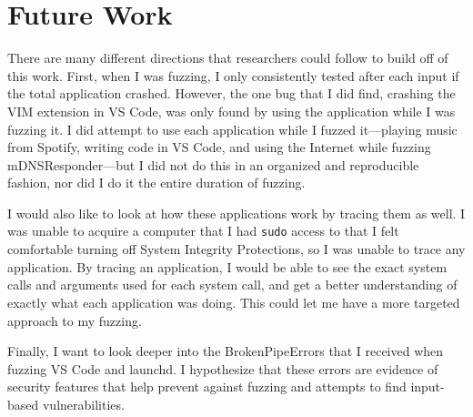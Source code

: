 \chapter{Future Work}
\label{sec:futureWork}
There are many different directions that researchers could follow to build off of this work.  First, when I was fuzzing, I only consistently tested after each input if the total application crashed.  However, the one bug that I did find, crashing the VIM extension in VS Code, was only found by using the application while I was fuzzing it.  I did attempt to use each application while I fuzzed it---playing music from Spotify, writing code in VS Code, and using the Internet while fuzzing mDNSResponder---but I did not do this in an organized and reproducible fashion, nor did I do it the entire duration of fuzzing.

I would also like to look at how these applications work by tracing them as well.  I was unable to acquire a computer that I had \texttt{sudo} access to that I felt comfortable turning off System Integrity Protections, so I was unable to trace any application.  By tracing an application, I would be able to see the exact system calls and arguments used for each system call, and get a better understanding of exactly what each application was doing.  This could let me have a more targeted approach to my fuzzing.

Finally, I want to look deeper into the BrokenPipeErrors that I received when fuzzing VS Code and launchd.  I hypothesize that these errors are evidence of security features that help prevent against fuzzing and attempts to find input-based vulnerabilities.
